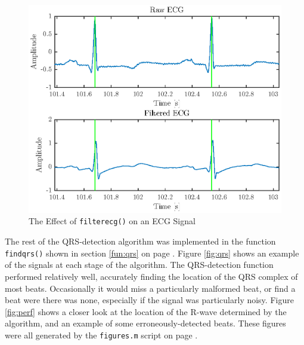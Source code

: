 \documentclass[titlepage,12pt,letter]{article}
\newcommand{\rpref}[1]{\ref{#1} on page \pageref{#1}}
\begin{document}
\begin{figure}[hbtp]
    \centering
    \includegraphics[height=0.42\textheight]{../figures/figures_02}
    \caption{The Effect of \texttt{filterecg()} on an ECG Signal}
    \label{fig:filter}
\end{figure}

The rest of the QRS-detection algorithm was implemented in the function
\verb`findqrs()` shown in section \rpref{fun:qrs}.  Figure \ref{fig:qrs} shows
an example of the signals at each stage of the algorithm.  The QRS-detection
function performed relatively well, accurately finding the location of the QRS
complex of most beats.  Occasionally it would miss a particularly malformed
beat, or find a beat were there was none, especially if the signal was
particularly noisy.  Figure \ref{fig:perf} shows a closer look at the location
of the R-wave determined by the algorithm, and an example of some
erroneously-detected beats.  These figures were all generated by the
\verb`figures.m` script on page \pageref{scr:figures}.  
\end{document}
